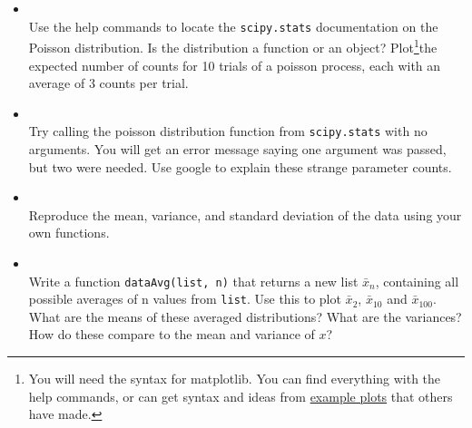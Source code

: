 \documentclass[justified]{tufte-handout}
\newcommand{\matplotlibGalleryLink}{http://matplotlib.org/gallery.html}
\newcommand{\matplotlibGalleryNote}{\footnote{You will need the syntax for
      matplotlib. You can find everything with the help commands, or can get
      syntax and ideas from \href{\matplotlibGalleryLink}{example plots} that
      others have made.}}
\begin{document}
\begin{itemize}
\item[]  \\
  Use the help commands to locate the \texttt{scipy.stats} documentation on the
  Poisson distribution. Is the distribution a function or an object?
  Plot\matplotlibGalleryNote \;the expected number of counts for 10 trials of a
  poisson process, each with an average of 3 counts per trial.

\item[]  \\
  Try calling the poisson distribution function from \texttt{scipy.stats} with
  no arguments. You will get an error message saying one argument was passed,
  but two were needed. Use google to explain these strange parameter counts.

\item[]  \\
  Reproduce the mean, variance, and standard deviation of the data using your
  own functions.




\item[] 
 \\
  Write a function \texttt{dataAvg(list, n)} that returns a new list
  $\bar{x}_n$, containing all possible averages of n values from
  \texttt{list}. Use this to plot $\bar{x}_2$, $\bar{x}_{10}$ and
  $\bar{x}_{100}$. What are the means of these averaged distributions? What are
  the variances? How do these compare to the mean and variance of $x$?
\end{itemize}
\end{document}
